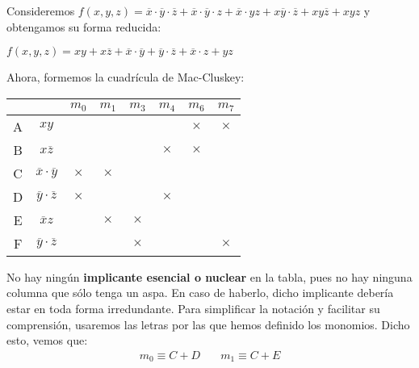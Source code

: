\begin{ejemplo}
    Consideremos $f(x,y,z) =\overline{x} \cdot \overline{y} \cdot \overline{z}+\overline{x} \cdot \overline{y} \cdot z+\overline{x} \cdot yz+x\overline{y} \cdot \overline{z}+xy\overline{z}+xyz$ y obtengamos su forma reducida:
    \begin{center} $f(x,y,z) =xy+x\overline{z}+\overline{x} \cdot \overline{y}+\overline{y} \cdot \overline{z}+\overline{x} \cdot z+yz$ \end{center}
    Ahora, formemos la cuadrícula de Mac-Cluskey:
    \begin{center}
        \begin{tabular}{ |c|c|c|c|c|c|c|c|  }
            \hline
              &                                   & $m_0$    & $m_1$    & $m_3$    & $m_4$    & $m_6$    & $m_7$    \\
            \hline
            A & $xy$                              &          &          &          &          & $\times$ & $\times$ \\
            \hline
            B & $x\overline{z}$                   &          &          &          & $\times$ & $\times$ &          \\
            \hline
            C & $\overline{x} \cdot \overline{y}$ & $\times$ & $\times$ &          &          &          &          \\
            \hline
            D & $\overline{y} \cdot \overline{z}$ & $\times$ &          &          & $\times$ &          &          \\
            \hline
            E & $\overline{x} z$                  &          & $\times$ & $\times$ &          &          &          \\
            \hline
            F & $\overline{y} \cdot \overline{z}$ &          &          & $\times$ &          &          & $\times$ \\
            \hline
        \end{tabular}
    \end{center}
    \smallskip
    No hay ningún \textbf{implicante esencial o nuclear} en la tabla, pues no hay ninguna columna que sólo tenga un aspa. En caso de haberlo, dicho implicante debería estar en toda forma irredundante.
    Para simplificar la notación y facilitar su comprensión, usaremos las letras por las que hemos definido los monomios. Dicho esto, vemos que:
    \begin{align*}
        m_0 \equiv C + D & \quad m_1 \equiv C + E \\

\end{align*}
\end{ejemplo}
